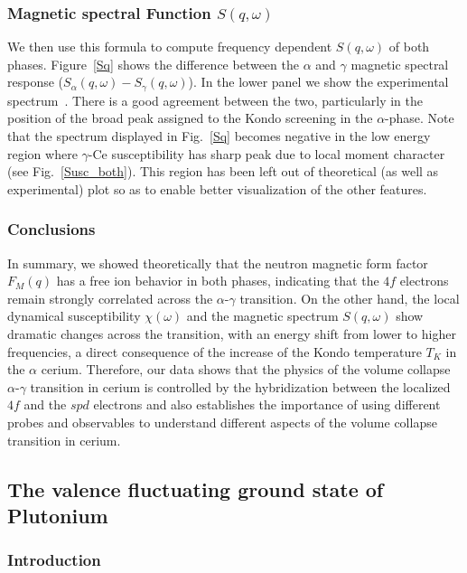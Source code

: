 \documentclass[10pt]{ruthesis}
\begin{document}
{\subsubsection{Magnetic  spectral Function $S(q,\omega)$}
  We then use this formula to
compute frequency dependent $S(q,\omega)$ of both phases.
Figure~\ref{Sq} shows the difference between the $\alpha$ and $\gamma$
magnetic spectral response ($S_\alpha(q,\omega)-S_\gamma(q,\omega)$).
In the lower panel we show the
experimental spectrum~\cite{murani}. There is a good agreement between
the two, particularly in the position of the broad peak assigned to
the Kondo screening in the $\alpha$-phase.  Note that the spectrum
displayed in Fig.~\ref{Sq} becomes negative in the low energy region
where $\gamma$-Ce susceptibility has sharp peak due to local moment character
(see Fig.~\ref{Susc_both}).  This region has been left out of
theoretical (as well as experimental) plot so as to enable better
visualization of the other features.

\subsubsection{Conclusions} 
In summary, we showed theoretically that the neutron magnetic form
factor $F_M(q)$ has a free ion behavior in both phases, indicating
that the $4f$ electrons remain strongly correlated across the
$\alpha$-$\gamma$ transition.  On the other hand, the local dynamical
susceptibility $\chi(\omega)$ and the magnetic spectrum $S(q,\omega)$
show dramatic changes across the transition, with an energy shift from
lower to higher frequencies, a direct consequence of the increase of
the Kondo temperature $T_K$ in the $\alpha$ cerium.  Therefore, our
data shows that the physics of the volume collapse $\alpha$-$\gamma$
transition in cerium is controlled by the hybridization between the
localized $4f$ and the $spd$ electrons and also establishes the
importance of using different probes and observables to understand
different aspects of the volume collapse transition in cerium.

\pagebreak
\subsection{The valence fluctuating ground state of Plutonium}

\subsubsection{Introduction}

}
\end{document}
